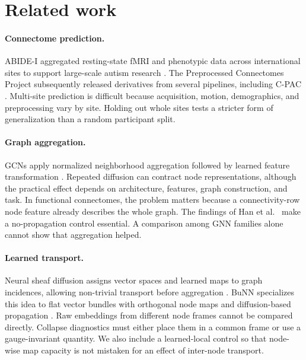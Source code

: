 \section{Related work}

\paragraph{Connectome prediction.}
ABIDE-I aggregated resting-state fMRI and phenotypic data across international
sites to support large-scale autism research \cite{dimartino2014abide}. The
Preprocessed Connectomes Project subsequently released derivatives from
several pipelines, including C-PAC \cite{abidepcp}. Multi-site prediction is
difficult because acquisition, motion, demographics, and preprocessing vary
by site. Holding out whole sites tests a stricter form of generalization than a
random participant split.

\paragraph{Graph aggregation.}
GCNs apply normalized neighborhood aggregation followed by learned feature
transformation \cite{kipf2017gcn}. Repeated diffusion can contract node
representations, although the practical effect depends on architecture,
features, graph construction, and task. In functional connectomes, the problem
matters because a connectivity-row node feature already describes the whole
graph. The findings of Han et al.\ \cite{han2026rethinking} make a no-propagation control
essential. A comparison among GNN families alone cannot show that aggregation
helped.

\paragraph{Learned transport.}
Neural sheaf diffusion assigns vector spaces and learned maps to graph
incidences, allowing non-trivial transport before aggregation
\cite{bodnar2022sheaf}. BuNN specializes this idea to flat vector bundles with
orthogonal node maps and diffusion-based propagation
\cite{bamberger2025bundle}. Raw embeddings from different node frames cannot
be compared directly. Collapse diagnostics must either place them in a common
frame or use a gauge-invariant quantity. We also include a learned-local
control so that node-wise map capacity is not mistaken for an effect of
inter-node transport.
